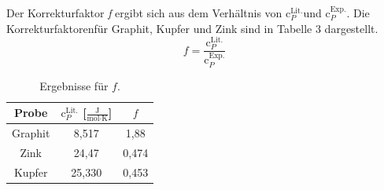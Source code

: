 \documentclass[12pt,a4paper,titlepage,headinclude,bibtotoc]{scrartcl}
\begin{document}
Der Korrekturfaktor \textit{f} ergibt sich aus dem Verhältnis von $\text{c}_P^{\text{Lit.}}$und $\text{c}_P^{\text{Exp.}}$. Die Korrekturfaktorenfür Graphit, Kupfer und Zink sind in Tabelle 3 dargestellt. 
\begin{equation}
f=\frac{\text{c}_P^{\text{Lit.}}}{\text{c}_P^{\text{Exp.}}}
\end{equation}
\begin{table}[h!]
\centering
\caption{Ergebnisse für $f$.}
\begin{tabular}{c|c|c}
Probe&$\text{c}_P^{\text{Lit.}}$ [$\frac{\text{J}}{\text{mol}\cdot\text{K}}$]&$f$\\
\hline
Graphit &8,517 &1,88 \\
\hline
Zink & 24,47&0,474  \\
\hline
Kupfer & 25,330&0,453\\
\end{tabular}
\end{table}
\FloatBarrier
\end{document}
